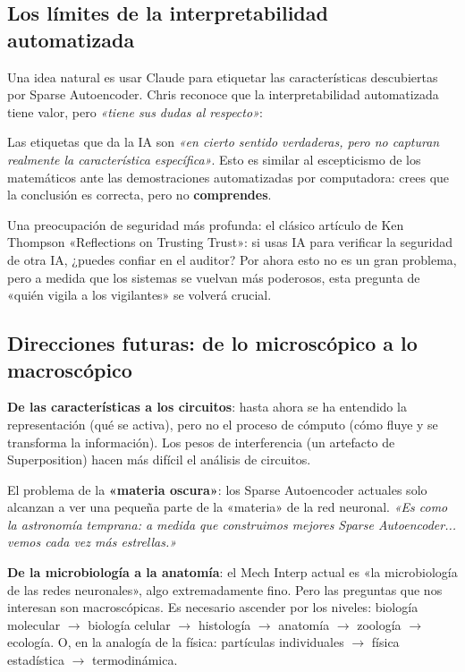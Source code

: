 \documentclass[a4paper]{article}
\begin{document}
\subsection{Los límites de la interpretabilidad automatizada}

Una idea natural es usar Claude para etiquetar las características descubiertas por Sparse Autoencoder. Chris reconoce que la interpretabilidad automatizada tiene valor, pero \textit{«tiene sus dudas al respecto»}:

Las etiquetas que da la IA son \textit{«en cierto sentido verdaderas, pero no capturan realmente la característica específica»}. Esto es similar al escepticismo de los matemáticos ante las demostraciones automatizadas por computadora: crees que la conclusión es correcta, pero no \textbf{comprendes}.

Una preocupación de seguridad más profunda: el clásico artículo de Ken Thompson «Reflections on Trusting Trust»: si usas IA para verificar la seguridad de otra IA, ¿puedes confiar en el auditor? Por ahora esto no es un gran problema, pero a medida que los sistemas se vuelvan más poderosos, esta pregunta de «quién vigila a los vigilantes» se volverá crucial.

\subsection{Direcciones futuras: de lo microscópico a lo macroscópico}

\textbf{De las características a los circuitos}: hasta ahora se ha entendido la representación (qué se activa), pero no el proceso de cómputo (cómo fluye y se transforma la información). Los pesos de interferencia (un artefacto de Superposition) hacen más difícil el análisis de circuitos.

El problema de la \textbf{«materia oscura»}: los Sparse Autoencoder actuales solo alcanzan a ver una pequeña parte de la «materia» de la red neuronal. \textit{«Es como la astronomía temprana: a medida que construimos mejores Sparse Autoencoder... vemos cada vez más estrellas.»}

\textbf{De la microbiología a la anatomía}: el Mech Interp actual es «la microbiología de las redes neuronales», algo extremadamente fino. Pero las preguntas que nos interesan son macroscópicas. Es necesario ascender por los niveles: biología molecular $\to$ biología celular $\to$ histología $\to$ anatomía $\to$ zoología $\to$ ecología. O, en la analogía de la física: partículas individuales $\to$ física estadística $\to$ termodinámica.
\end{document}

